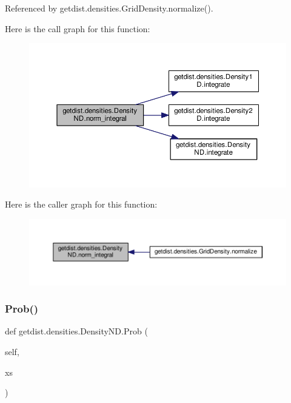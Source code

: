 Referenced by getdist.\+densities.\+Grid\+Density.\+normalize().

Here is the call graph for this function\+:
\nopagebreak
\begin{figure}[H]
\begin{center}
\leavevmode
\includegraphics[width=350pt]{classgetdist_1_1densities_1_1DensityND_a6967eace9747b5521051c675036db2d8_cgraph}
\end{center}
\end{figure}
Here is the caller graph for this function\+:
\nopagebreak
\begin{figure}[H]
\begin{center}
\leavevmode
\includegraphics[width=350pt]{classgetdist_1_1densities_1_1DensityND_a6967eace9747b5521051c675036db2d8_icgraph}
\end{center}
\end{figure}
\mbox{\label{classgetdist_1_1densities_1_1DensityND_a4e43700140c1f543d4b079bb8e4906c3}} 
\subsubsection{\texorpdfstring{Prob()}{Prob()}}
{\footnotesize\ttfamily def getdist.\+densities.\+Density\+N\+D.\+Prob (\begin{DoxyParamCaption}\item[{}]{self,  }\item[{}]{xs }\end{DoxyParamCaption})}


